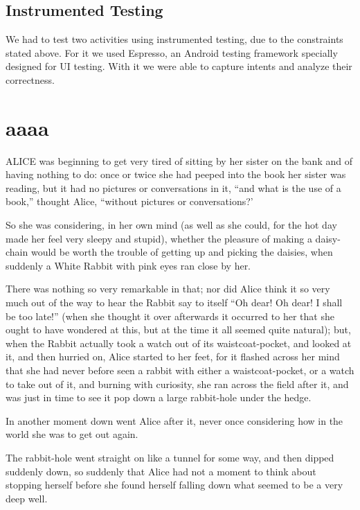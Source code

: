 \documentclass{l3proj}
\begin{document}
\subsection{Instrumented Testing}

We had to test two activities using instrumented testing, due to the constraints
stated above. For it we used Espresso, an Android testing framework specially 
designed for UI testing. With it we were able to capture intents and analyze their
correctness\cite{Espresso}.


\section{aaaa}
\label{sec:alice}

ALICE \cite{alice} was beginning to get very tired of sitting by her sister
on the bank and of having nothing to do: once or twice she had peeped into
the book her sister was reading, but it had no pictures or conversations in
it, ``and what is the use of a book,'' thought Alice, ``without pictures or
conversations?'

So she was considering, in her own mind (as well as she could, for the hot
day made her feel very sleepy and stupid), whether the pleasure of making a
daisy-chain would be worth the trouble of getting up and picking the
daisies, when suddenly a White Rabbit with pink eyes ran close by her.

There was nothing so very remarkable in that; nor did Alice think it so
very much out of the way to hear the Rabbit say to itself ``Oh dear! Oh
dear! I shall be too late!'' (when she thought it over afterwards it
occurred to her that she ought to have wondered at this, but at the time it
all seemed quite natural); but, when the Rabbit actually took a watch out
of its waistcoat-pocket, and looked at it, and then hurried on, Alice
started to her feet, for it flashed across her mind that she had never
before seen a rabbit with either a waistcoat-pocket, or a watch to take out
of it, and burning with curiosity, she ran across the field after it, and
was just in time to see it pop down a large rabbit-hole under the hedge.

In another moment down went Alice after it, never once considering how in
the world she was to get out again.

The rabbit-hole went straight on like a tunnel for some way, and then
dipped suddenly down, so suddenly that Alice had not a moment to think
about stopping herself before she found herself falling down what seemed to
be a very deep well.
\end{document}
